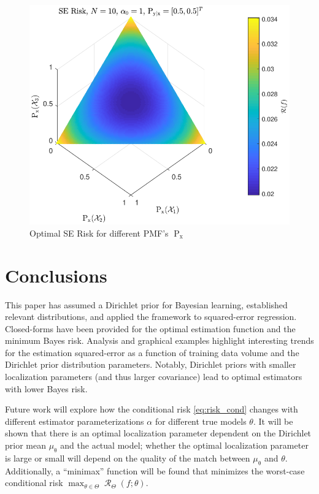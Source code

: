 \documentclass{article}
\DeclareMathOperator{\xrm}{\mathrm{x}}
\DeclareMathOperator{\Prm}{\mathrm{P}}
\DeclareMathOperator{\Rcal}{\mathcal{R}}
\begin{document}
\begin{figure}
\centering
\includegraphics[width=1.0\linewidth]{Risk_SE_Dir_IO_Px_N_10_a0_1.pdf}
\caption{Optimal SE Risk for different PMF's $\Prm_{\xrm}$}
\label{fig:Risk_SE_Dir_IO_Px_N_10_a0_1}
\end{figure}





\section{Conclusions}

This paper has assumed a Dirichlet prior for Bayesian learning, established relevant distributions, and applied the framework to squared-error regression. Closed-forms have been provided for the optimal estimation function and the minimum Bayes risk. Analysis and graphical examples highlight interesting trends for the estimation squared-error as a function of training data volume and the Dirichlet prior distribution parameters. Notably, Dirichlet priors with smaller localization parameters (and thus larger covariance) lead to optimal estimators with lower Bayes risk. 

Future work will explore how the conditional risk \eqref{eq:risk_cond} changes with different estimator parameterizations $\alpha$ for different true models $\theta$. It will be shown that there is an optimal localization parameter dependent on the Dirichlet prior mean $\mu_{\uptheta}$ and the actual model; whether the optimal localization parameter is large or small will depend on the quality of the match between $\mu_{\uptheta}$ and $\theta$. Additionally, a ``minimax'' function will be found that minimizes the worst-case conditional risk $\max_{\theta \in \Theta}\Rcal_{\Theta}(f ; \theta)$.
\end{document}
